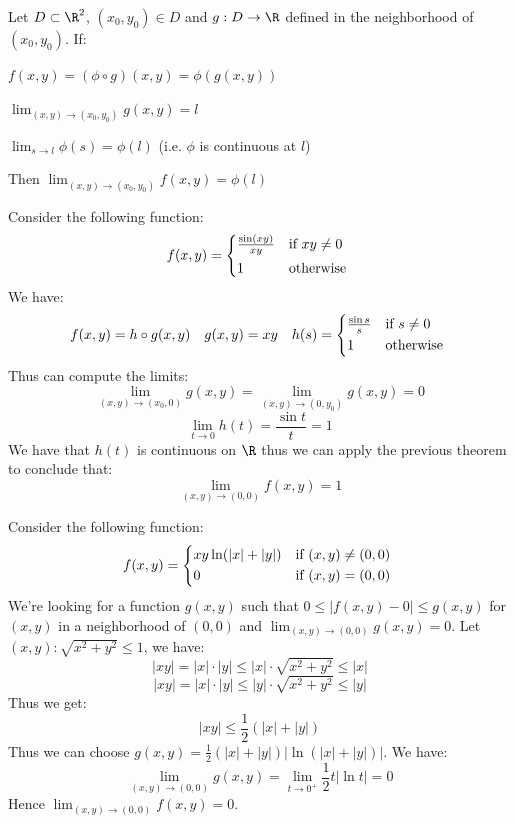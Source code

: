 \begin{theorem}
    Let $D \subset \R^2$, $(x_0,y_0) \in D$ and $g: D \to \R$ defined in the neighborhood of $(x_0, y_0)$. If:
    \begin{citemize}
        \item $f(x,y) = (\phi \circ g)(x,y) = \phi(g(x,y))$
        \item $\lim_{(x,y) \to (x_0, y_0)} g(x,y) = l$
        \item $\lim_{s \to l} \phi (s) = \phi(l)$ (i.e. $\phi$ is continuous at $l$)
    \end{citemize}
    Then $\lim_{(x,y) \to (x_0,y_0)} f(x,y) = \phi(l)$
\end{theorem}

\begin{eg}
    Consider the following function:
    \[
        f(x,y) = \begin{cases*}
            \frac{\sin(xy)}{xy} & if $xy \neq 0$ \\
            1 & otherwise
        \end{cases*}
    \]
    We have:
    \[
        f(x,y) = h \circ g (x,y) \quad g(x,y) = xy \quad h(s) = \begin{cases*}
            \frac{\sin s}{s} & if $s \neq 0$ \\
            1 & otherwise
        \end{cases*}
    \]
    Thus can compute the limits:
    \[
        \lim_{(x,y) \to (x_0, 0)} g(x,y) = \lim_{(x,y) \to (0,y_0)} g(x,y) = 0
    \]
    \[
        \lim_{t \to 0} h(t) = \frac{\sin t}{t} = 1
    \]
    We have that $h(t)$ is continuous on $\R$ thus we can apply the previous theorem to conclude that:
    \[
        \lim_{(x,y) \to (0,0)} f(x,y) = 1
    \]
\end{eg}

\begin{eg}
    Consider the following function:
    \[
        f(x,y) = \begin{cases*}
            xy \ln (|x| + |y|) & if $(x,y) \neq (0,0)$ \\
            0 & if $(x,y) = (0,0)$
        \end{cases*}
    \]
    We're looking for a function $g(x,y)$ such that $0 \leq |f(x,y) - 0| \leq g(x,y)$ for $(x,y)$ in a neighborhood of $(0,0)$ and $\lim_{(x,y) \to (0,0)} g(x,y) = 0$. Let $(x,y): \sqrt{x^2 + y^2} \leq 1$, we have:
    \[
        |xy| = |x| \cdot |y| \leq |x| \cdot \sqrt{x^2 + y^2} \leq |x|
    \]
    \[
        |xy| = |x| \cdot |y| \leq |y| \cdot \sqrt{x^2 + y^2} \leq |y|
    \]
    Thus we get:
    \[
        |xy| \leq \frac{1}{2} (|x| + |y|)
    \]
    Thus we can choose $g(x,y) = \frac{1}{2} (|x| + |y|) |\ln (|x| + |y|)|$. We have:
    \[
        \lim_{(x,y) \to (0,0)} g(x,y) = \lim_{t \to 0^+} \frac{1}{2} t |\ln t| = 0
    \]
    Hence $\lim_{(x,y) \to (0,0)} f(x,y) = 0$.
\end{eg}

